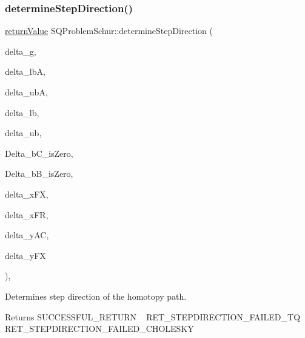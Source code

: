 \subsubsection{\texorpdfstring{determine\+Step\+Direction()}{determineStepDirection()}}
{\footnotesize\ttfamily \hyperlink{_message_handling_8hpp_a81d556f613bfbabd0b1f9488c0fa865e}{return\+Value} S\+Q\+Problem\+Schur\+::determine\+Step\+Direction (\begin{DoxyParamCaption}\item[{const \hyperlink{qp_o_a_s_e_s__wrapper_8h_a0d00e2b3dfadee81331bbb39068570c4}{real\+\_\+t} $\ast$const}]{delta\+\_\+g,  }\item[{const \hyperlink{qp_o_a_s_e_s__wrapper_8h_a0d00e2b3dfadee81331bbb39068570c4}{real\+\_\+t} $\ast$const}]{delta\+\_\+lbA,  }\item[{const \hyperlink{qp_o_a_s_e_s__wrapper_8h_a0d00e2b3dfadee81331bbb39068570c4}{real\+\_\+t} $\ast$const}]{delta\+\_\+ubA,  }\item[{const \hyperlink{qp_o_a_s_e_s__wrapper_8h_a0d00e2b3dfadee81331bbb39068570c4}{real\+\_\+t} $\ast$const}]{delta\+\_\+lb,  }\item[{const \hyperlink{qp_o_a_s_e_s__wrapper_8h_a0d00e2b3dfadee81331bbb39068570c4}{real\+\_\+t} $\ast$const}]{delta\+\_\+ub,  }\item[{\hyperlink{_types_8hpp_a20f82124c82b6f5686a7fce454ef9089}{Boolean\+Type}}]{Delta\+\_\+b\+C\+\_\+is\+Zero,  }\item[{\hyperlink{_types_8hpp_a20f82124c82b6f5686a7fce454ef9089}{Boolean\+Type}}]{Delta\+\_\+b\+B\+\_\+is\+Zero,  }\item[{\hyperlink{qp_o_a_s_e_s__wrapper_8h_a0d00e2b3dfadee81331bbb39068570c4}{real\+\_\+t} $\ast$const}]{delta\+\_\+x\+FX,  }\item[{\hyperlink{qp_o_a_s_e_s__wrapper_8h_a0d00e2b3dfadee81331bbb39068570c4}{real\+\_\+t} $\ast$const}]{delta\+\_\+x\+FR,  }\item[{\hyperlink{qp_o_a_s_e_s__wrapper_8h_a0d00e2b3dfadee81331bbb39068570c4}{real\+\_\+t} $\ast$const}]{delta\+\_\+y\+AC,  }\item[{\hyperlink{qp_o_a_s_e_s__wrapper_8h_a0d00e2b3dfadee81331bbb39068570c4}{real\+\_\+t} $\ast$const}]{delta\+\_\+y\+FX }\end{DoxyParamCaption})\hspace{0.3cm}{\ttfamily [protected]}, {\ttfamily [virtual]}}

Determines step direction of the homotopy path. \begin{DoxyReturn}{Returns}
S\+U\+C\+C\+E\+S\+S\+F\+U\+L\+\_\+\+R\+E\+T\+U\+RN ~\newline
 R\+E\+T\+\_\+\+S\+T\+E\+P\+D\+I\+R\+E\+C\+T\+I\+O\+N\+\_\+\+F\+A\+I\+L\+E\+D\+\_\+\+TQ ~\newline
 R\+E\+T\+\_\+\+S\+T\+E\+P\+D\+I\+R\+E\+C\+T\+I\+O\+N\+\_\+\+F\+A\+I\+L\+E\+D\+\_\+\+C\+H\+O\+L\+E\+S\+KY 
\end{DoxyReturn}

